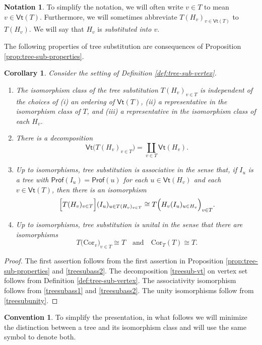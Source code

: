 \documentclass[11pt]{amsbook}
\numberwithin{section}{chapter}
\numberwithin{subsection}{section}
\numberwithin{equation}{section}
\theoremstyle{plain}
\newtheorem{corollary}[equation]{Corollary}
\theoremstyle{definition}
\newtheorem{convention}[equation]{Convention}
\newtheorem{notation}[equation]{Notation}
\newcommand{\Cor}{\mathrm{Cor}}
\newcommand{\Prof}{\mathsf{Prof}}
\newcommand{\profofu}{\Prof(u)}
\newcommand{\Vt}{\mathsf{Vt}}
\newcommand{\coprodover}[1]{\underset{#1}{\coprod}}
\newcommand{\andspace}{\quad\text{and}\quad}
\begin{document}
\begin{notation}
To simplify the notation, we will often write $v\in T$ to mean $v \in \Vt(T)$.  Furthermore, we will sometimes abbreviate $T(H_v)_{v\in\Vt(T)}$ to $T(H_v)$.  We will say that $H_v$ is \emph{substituted into $v$}.
\end{notation}

The following properties of tree substitution are consequences of Proposition \ref{prop:tree-sub-properties}.

\begin{corollary}\label{cor:treesub-assunity}
Consider the setting of Definition \ref{def:tree-sub-vertex}.
\begin{enumerate} \item The isomorphism class of the tree substitution $T(H_v)_{v\in T}$ is independent of the choices of (i) an ordering of $\Vt(T)$, (ii) a representative in the isomorphism class of $T$, and (iii) a representative in the isomorphism class of each $H_v$.
\item There is a decomposition 
\begin{equation}\label{treesub-vt}
\Vt\bigl(T(H_v)_{v\in T}\bigr)=\coprodover{v\in T} \Vt(H_v).
\end{equation}
\item Up to isomorphisms, tree substitution is associative in the sense that, if $I_u$ is a tree with $\Prof(I_u) = \profofu$ for each $u \in \Vt(H_v)$ and each $v \in \Vt(T)$, then there is an isomorphism
\[\Bigl[T(H_v)_{v\in T}\Bigr](I_u)_{u\in T(H_v)_{v\in T}} \cong T\Bigl(H_v(I_u)_{u\in H_v}\Bigr)_{v\in T}.\]
\item Up to isomorphisms, tree substitution is unital in the sense that there are isomorphisms
\[T\bigl(\Cor_v\bigr)_{v\in T} \cong T \andspace \Cor_T(T) \cong T.\]
\end{enumerate}
\end{corollary}

\begin{proof}
The first assertion follows from the first assertion in Proposition \ref{prop:tree-sub-properties} and \eqref{treesubass2}.  The decomposition \ref{treesub-vt} on vertex set follows from Definition \ref{def:tree-sub-vertex}.  The associativity isomorphism follows from \eqref{treesubass1} and \eqref{treesubass2}.  The unity isomorphisms follow from \eqref{treesubunity}.
\end{proof}

\begin{convention}\label{conv:tree-isoclass}
To simplify the presentation, in what follows we will minimize the distinction between a tree and its isomorphism class and will use the same symbol to denote both.
\end{convention}
\end{document}
